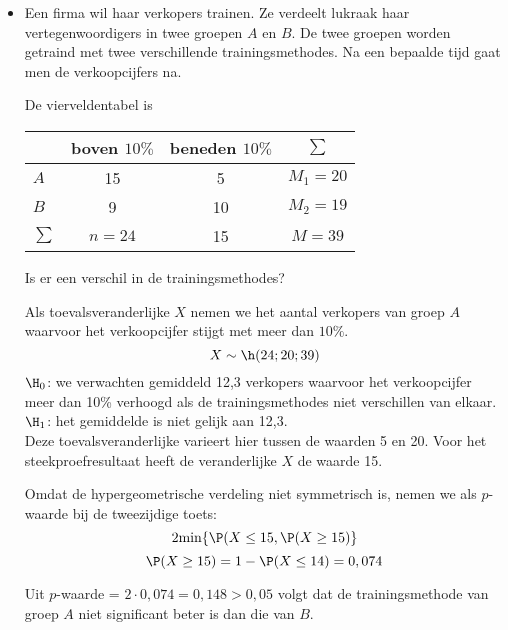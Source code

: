 {\begin{itemize}
\begin{figure}[h]\label{hyp1}
\texttt{[image: stat4\_03.jpg]}
\caption{Hypergeometrische verdeling voor $n=9$, $M_1=12$ en $M_2=8$}
\end{figure}

 

Vanaf 8 genezingen met het nieuwe medicament zouden we de nulhypothese 
verwerpen want dan geldt dat de $p$-waarde = $\P(X\geq 8)=0,0249<0,05.$

\item  Een firma wil haar verkopers trainen. Ze verdeelt lukraak haar 
vertegenwoordigers in twee groepen $A$ en $B$. De twee groepen worden getraind 
met twee verschillende trainingsmethodes. Na een bepaalde tijd gaat men 
de verkoopcijfers na.

De vierveldentabel is

\begin{center}
\begin{tabular}{l|c|c|c}
  & boven $10\%$ & beneden $10\%$  & $\sum$\\
  \hline
$A$ & 15 & 5 & $M_1=20$\\
  \hline
$B$ & 9 & 10 & $M_2=19$\\
  \hline
$\sum$ & $n=24$ & 15 & $M=39$
\end{tabular}
  \end{center}

Is er een verschil in de trainingsmethodes?

Als toevalsveranderlijke $X$ nemen we het aantal verkopers van groep $A$
waarvoor het 
verkoopcijfer stijgt met meer dan $10\%$. 
$$X\sim\h(24;20;39)$$
$\H_0$: we verwachten gemiddeld 12,3 verkopers waarvoor het verkoopcijfer meer dan 10\% verhoogd als de trainingsmethodes niet verschillen van elkaar.\\
$\H_1$: het gemiddelde is niet gelijk aan 12,3.\\
Deze toevalsveranderlijke 
 varieert hier tussen de waarden
5 en 20. Voor het steekproefresultaat heeft de veranderlijke $X$ de waarde 15. 
 
Omdat de hypergeometrische verdeling niet symmetrisch is, nemen we als $p$-waarde bij de tweezijdige toets:
$$2\mbox{min}\{\P(X\leq 15,\P(X\geq 15)\}$$
$$\P(X\geq 15)=1-\P(X\leq 14)= 0,074$$


Uit $p$-waarde = $2\cdot 0,074=0,148>0,05$ volgt dat de  trainingsmethode van groep $A$  niet significant beter is dan die van $B$.
\end{itemize}

}

